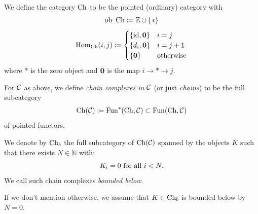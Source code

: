 \begin{defn}\label{def:Ch}
    We define the category $\operatorname{Ch}$ to be the pointed (ordinary) category with
    \begin{equation*}
        \operatorname{ob} \ \operatorname{Ch} \coloneqq \mathbb{Z} \cup \{*\}
    \end{equation*}
    \begin{equation*}
        \operatorname{Hom}_{\operatorname{Ch}}(i,j) \coloneqq \begin{cases}
            \{ \mathrm{id}, \mathbf{0} \} & i=j \\
            \{ d_i, \mathbf{0} \} & i=j+1 \\
            \{\mathbf{0}\} & \text{otherwise}
        \end{cases}
    \end{equation*}
    where $*$ is the zero object and $\mathbf{0}$ is the map $i \to * \to j$.

    For $\mathcal{C}$ as above, we define \textit{chain complexes in $\mathcal{C}$} (or just \textit{chains}) to be the full subcategory
    \begin{equation*}
        \operatorname{Ch}(\mathcal{C}) \coloneqq \operatorname{Fun}^*(\operatorname{Ch},\mathcal{C}) \subset \operatorname{Fun}(\operatorname{Ch},\mathcal{C})
    \end{equation*}
    of pointed functors.

    We denote by $\operatorname{Ch}_b$ the full subcategory of $\operatorname{Ch}(\mathcal{C})$ spanned by the objects $K$ such that there exists $N \in \mathbb{N}$ with:
    \begin{equation*}
        K_i = 0 \text{ for all } i < N.
    \end{equation*}
    We call such chain complexes \emph{bounded below}.
\end{defn}

\begin{rem*}
    If we don't mention otherwise, we assume that $K \in \operatorname{Ch}_b$ is bounded below by $N=0$.
\end{rem*}

